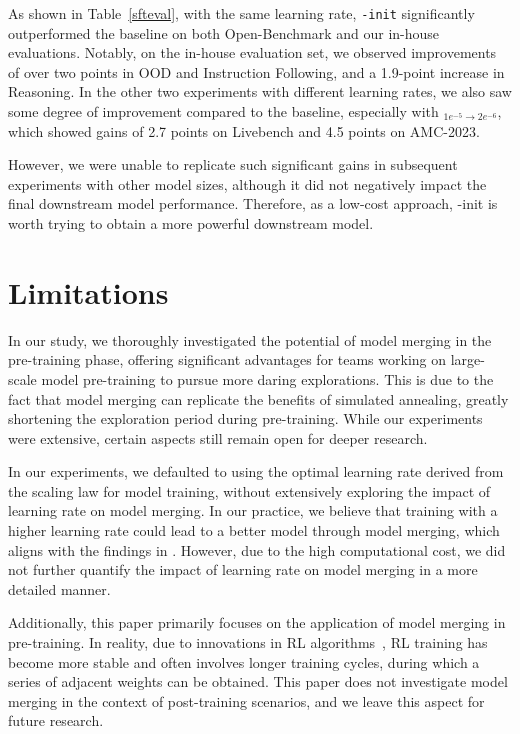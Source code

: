 As shown in Table~\ref{sfteval}, with the same learning rate, \texttt{\OURS{}-init} significantly outperformed the baseline on both Open-Benchmark and our in-house evaluations. 
Notably, on the in-house evaluation set, we observed improvements of over two points in OOD and Instruction Following, and a 1.9-point increase in Reasoning. 
In the other two experiments with different learning rates, we also saw some degree of improvement compared to the baseline, especially with \OURS{}$_{1e^{-5}\rightarrow2e^{-6}}$, which showed gains of 2.7 points on Livebench and 4.5 points on AMC-2023.

However, we were unable to replicate such significant gains in subsequent experiments with other model sizes, although it did not negatively impact the final downstream model performance. Therefore, as a low-cost approach, \OURS{}-init is worth trying to obtain a more powerful downstream model.

\section{Limitations}
\label{limitations}
In our study, we thoroughly investigated the potential of model merging in the pre-training phase, offering significant advantages for teams working on large-scale model pre-training to pursue more daring explorations. This is due to the fact that model merging can replicate the benefits of simulated annealing, greatly shortening the exploration period during pre-training. While our experiments were extensive, certain aspects still remain open for deeper research.

In our experiments, we defaulted to using the optimal learning rate derived from the scaling law for model training, without extensively exploring the impact of learning rate on model merging. In our practice, we believe that training with a higher learning rate could lead to a better model through model merging, which aligns with the findings in \cite{sanyal2023early}. However, due to the high computational cost, we did not further quantify the impact of learning rate on model merging in a more detailed manner. 

Additionally, this paper primarily focuses on the application of model merging in pre-training. In reality, due to innovations in RL algorithms~\citep{yu2025dapo,yuan2025vapo,shao2024deepseekmath}, RL training has become more stable and often involves longer training cycles, during which a series of adjacent weights can be obtained. This paper does not investigate model merging in the context of post-training scenarios, and we leave this aspect for future research.

